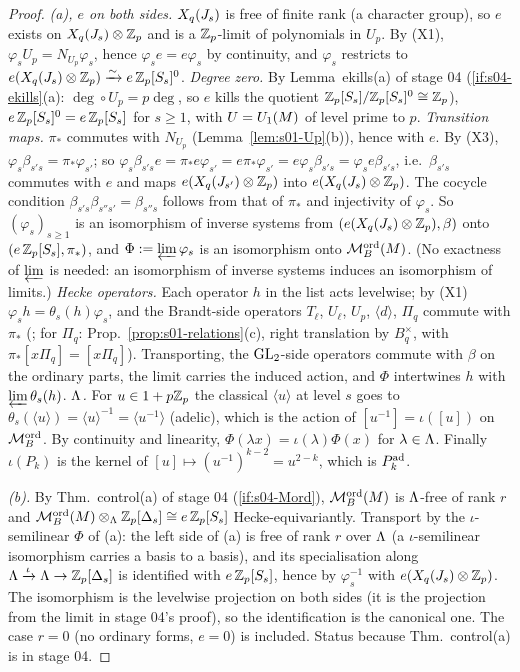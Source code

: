 \begin{proof}
\emph{(a), $e$ on both sides.} $X_q(J_s)$ is free of finite rank (a character group), so $e$ exists on $X_q(J_s)\otimes\mathbb{Z}_p$ and is a
$\mathbb{Z}_p$-limit of polynomials in $U_p$. By (X1), $\varphi_s U_p=N_{U_p}\varphi_s$, hence $\varphi_s e=e\varphi_s$ by continuity, and
$\varphi_s$ restricts to $e(X_q(J_s)\otimes\mathbb{Z}_p)\xrightarrow{\sim}e\,\mathbb{Z}_p[S_s]^0$.
\emph{Degree zero.} By Lemma~ekills(a) of stage 04 (\ref{if:s04-ekills}(a): $\deg\circ U_p=p\deg$, so $e$ kills the quotient
$\mathbb{Z}_p[S_s]/\mathbb{Z}_p[S_s]^0\cong\mathbb{Z}_p$), $e\,\mathbb{Z}_p[S_s]^0=e\,\mathbb{Z}_p[S_s]$ for $s\ge1$, with $U=U_1(M)$ of level prime to $p$.
\emph{Transition maps.} $\pi_*$ commutes with $N_{U_p}$ (Lemma~\ref{lem:s01-Up}(b)), hence with $e$. By (X3), $\varphi_s\beta_{s's}=\pi_*\varphi_{s'}$;
so $\varphi_s\beta_{s's}e=\pi_*e\varphi_{s'}=e\pi_*\varphi_{s'}=e\varphi_s\beta_{s's}=\varphi_se\beta_{s's}$, i.e.\ $\beta_{s's}$ commutes with $e$ and maps
$e(X_q(J_{s'})\otimes\mathbb{Z}_p)$ into $e(X_q(J_s)\otimes\mathbb{Z}_p)$. The cocycle condition $\beta_{s's}\beta_{s''s'}=\beta_{s''s}$ follows from that of $\pi_*$ and
injectivity of $\varphi_s$. So $(\varphi_s)_{s\ge1}$ is an isomorphism of inverse systems from $(e(X_q(J_s)\otimes\mathbb{Z}_p),\beta)$ onto
$(e\,\mathbb{Z}_p[S_s],\pi_*)$, and $\Phi:=\varprojlim\varphi_s$ is an isomorphism onto $\mathcal{M}^{\mathrm{ord}}_B(M)$. (No exactness of $\varprojlim$ is needed: an
isomorphism of inverse systems induces an isomorphism of limits.)
\emph{Hecke operators.} Each operator $h$ in the list acts levelwise; by (X1) $\varphi_s h=\theta_s(h)\varphi_s$, and the Brandt-side operators
$T_\ell$, $U_\ell$, $U_p$, $\langle d\rangle$, $\Pi_q$ commute with $\pi_*$ (; for $\Pi_q$: Prop.~\ref{prop:s01-relations}(c), right
translation by $B_q^\times$, with $\pi_*[x\Pi_q]=[x\Pi_q]$). Transporting, the $\mathrm{GL}_2$-side operators commute with $\beta$ on the ordinary parts, the
limit carries the induced action, and $\Phi$ intertwines $h$ with $\varprojlim\theta_s(h)$.
\emph{$\Lambda$.} For $u\in1+p\mathbb{Z}_p$ the classical $\langle u\rangle$ at level $s$ goes to $\theta_s(\langle u\rangle)=\langle u\rangle^{-1}=\langle u^{-1}\rangle$ (adelic), which is
the action of $[u^{-1}]=\iota([u])$ on $\mathcal{M}^{\mathrm{ord}}_B$. By continuity and linearity, $\Phi(\lambda x)=\iota(\lambda)\Phi(x)$ for $\lambda\in\Lambda$. Finally
$\iota(P_k)$ is the kernel of $[u]\mapsto(u^{-1})^{k-2}=u^{2-k}$, which is $P^{\rm ad}_k$.

\emph{(b).} By Thm.~control(a) of stage 04 (\ref{if:s04-Mord}), $\mathcal{M}^{\mathrm{ord}}_B(M)$ is $\Lambda$-free of rank $r$ and
$\mathcal{M}^{\mathrm{ord}}_B(M)\otimes_\Lambda\mathbb{Z}_p[\Delta_s]\cong e\,\mathbb{Z}_p[S_s]$ Hecke-equivariantly. Transport by the $\iota$-semilinear $\Phi$ of (a): the left side of (a) is free of
rank $r$ over $\Lambda$ (a $\iota$-semilinear isomorphism carries a basis to a basis), and its specialisation along $\Lambda\xrightarrow{\iota}\Lambda\to\mathbb{Z}_p[\Delta_s]$
is identified with $e\,\mathbb{Z}_p[S_s]$, hence by $\varphi_s^{-1}$ with $e(X_q(J_s)\otimes\mathbb{Z}_p)$. The isomorphism is the levelwise projection on both sides
(it is the projection from the limit in stage 04's proof), so the identification is the canonical one. The case $r=0$ (no ordinary forms,
$e=0$) is included. Status \stpmc{} because Thm.~control(a) is \stpmc{} in stage 04.


\end{proof}

